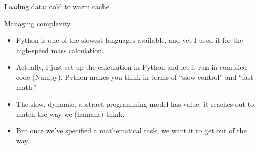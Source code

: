 \documentclass[aspectratio=169]{beamer}
\begin{document}
\begin{frame}{Loading data: cold to warm cache}
\vspace{0.25 cm}
\begin{center}

\end{center}
\end{frame}

\begin{frame}{Managing complexity}
\vspace{0.5 cm}
\begin{itemize}\setlength{\itemsep}{0.4 cm}
\item Python is one of the slowest languages available, and yet I used it for the high-speed mass calculation.
\item<2-> Actually, I just set up the calculation in Python and let it run in compiled code (Numpy). Python makes you think in terms of ``slow control'' and ``fast math.''
\item<3-> The slow, dynamic, abstract programming model has value: it reaches out to match the way we (humans) think.
\item<4-> But once we've specified a mathematical task, we want it to get out of the way.
\end{itemize}
\end{frame}
\end{document}
